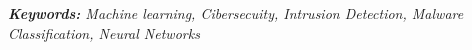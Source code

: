 \documentclass[11pt,a4paper]{book}
\begin{document}
\vspace{0.6 cm}
\textsl{\textbf{Keywords:} Machine learning, Cibersecuity, Intrusion Detection, Malware Classification, Neural Networks} 


\newpage
\tableofcontents

\newpage
\clearpage
{}

\end{document}
